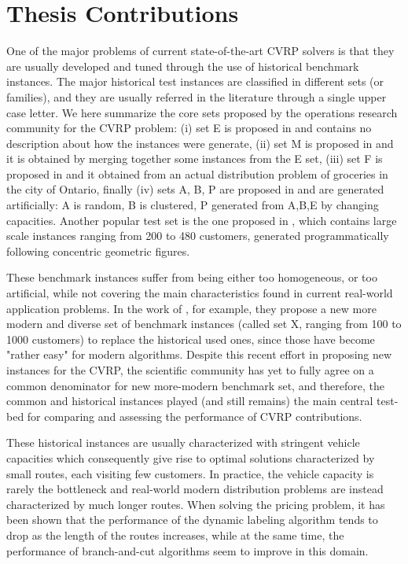 \section{Thesis Contributions}
\label{sec:intro-thesis-contributions}

One of the major problems of current state-of-the-art CVRP solvers
is that they are usually developed and tuned through the use of historical
benchmark instances.
The major historical test instances are classified in different sets (or families), and
they are usually referred in the literature through a single upper case letter.
We here summarize the core sets proposed by the operations research community for the CVRP problem:
(i) set E is proposed in \textcite{christofides1969} and contains no description about how the instances were generate,
(ii) set M is proposed in \textcite{christofides1979} and it is obtained by merging together some instances from the E set,
(iii) set F is proposed in \textcite{fisher1994} and it obtained from an actual distribution problem of groceries in the city of Ontario,
finally (iv) sets A, B, P are proposed in \textcite{augerat1995} and are generated artificially: A is random, B is clustered, P generated from A,B,E by changing capacities.
Another popular test set is the one proposed in \textcite{golden1998},
which contains large scale instances ranging from 200 to 480 customers,
generated programmatically following concentric geometric figures.

These benchmark instances suffer from being either too homogeneous, or too artificial,
while not covering the main characteristics found in current real-world application problems.
In the work of \textcite{uchoa2017}, for example, they propose
a new more modern and diverse set of benchmark instances (called set X, ranging from 100 to 1000 customers)
to replace the historical used ones, since those have become "rather easy" for modern algorithms.
Despite this recent effort in proposing new instances for the CVRP, the scientific community
has yet to fully agree on a common denominator for new more-modern benchmark set, and therefore,
the common and historical instances played (and still remains) the main central test-bed for comparing
and assessing the performance of CVRP contributions.

These historical instances are usually characterized with stringent vehicle capacities
which consequently give rise to optimal solutions characterized by small routes, each visiting few customers.
In practice, the vehicle capacity is rarely the bottleneck and
real-world modern distribution problems are instead characterized by much longer routes.
When solving the pricing problem, it  has been shown that the performance of the dynamic labeling algorithm
tends to drop as the length of the routes increases,
while at the same time,
the performance of branch-and-cut algorithms seem to improve in this domain.

